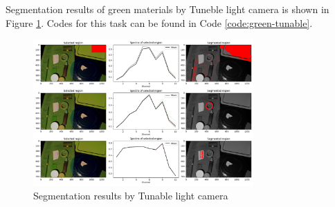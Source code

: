 Segmentation results of green materials by Tuneble light camera is
shown in Figure \ref{fig:green-tunable}.
Codes for this task can be found in Code \ref{code:green-tunable}.

\begin{figure}[H]
  \centering
  \caption{Segmentation results by Tunable light camera}
  \label{fig:green-tunable}
  \includegraphics[width=0.75\textwidth]{./fig/task1/tunable.png}
\end{figure}